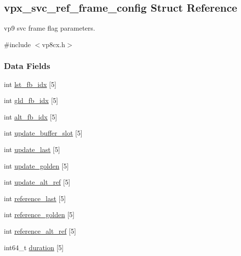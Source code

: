 \hypertarget{structvpx__svc__ref__frame__config}{}\subsection{vpx\+\_\+svc\+\_\+ref\+\_\+frame\+\_\+config Struct Reference}
\label{structvpx__svc__ref__frame__config}


vp9 svc frame flag parameters.  




{\ttfamily \#include $<$vp8cx.\+h$>$}

\subsubsection*{Data Fields}
\begin{DoxyCompactItemize}
\item 
int \hyperlink{structvpx__svc__ref__frame__config_a19b5483bc516fc83469d5967dc966783}{lst\+\_\+fb\+\_\+idx} \mbox{[}5\mbox{]}
\item 
int \hyperlink{structvpx__svc__ref__frame__config_a4af48b570c3262ad1d6fc7d436a7d5cc}{gld\+\_\+fb\+\_\+idx} \mbox{[}5\mbox{]}
\item 
int \hyperlink{structvpx__svc__ref__frame__config_ab2a913dc166956efad8bdf6ad009b2eb}{alt\+\_\+fb\+\_\+idx} \mbox{[}5\mbox{]}
\item 
int \hyperlink{structvpx__svc__ref__frame__config_a3ff7ebe7b8056278efbbb9abae4d830a}{update\+\_\+buffer\+\_\+slot} \mbox{[}5\mbox{]}
\item 
int \hyperlink{structvpx__svc__ref__frame__config_a8c6315e853ebf15e3e621332d77f4232}{update\+\_\+last} \mbox{[}5\mbox{]}
\item 
int \hyperlink{structvpx__svc__ref__frame__config_ae97b52fa83d6589a1efdae7f2747fe72}{update\+\_\+golden} \mbox{[}5\mbox{]}
\item 
int \hyperlink{structvpx__svc__ref__frame__config_a2f4ed0250ec58bc3b1faa0d49fbdf436}{update\+\_\+alt\+\_\+ref} \mbox{[}5\mbox{]}
\item 
int \hyperlink{structvpx__svc__ref__frame__config_a812c764e0bd981b7083d66557595aa09}{reference\+\_\+last} \mbox{[}5\mbox{]}
\item 
int \hyperlink{structvpx__svc__ref__frame__config_a8b61c119c626ec78b29ef52d0def7810}{reference\+\_\+golden} \mbox{[}5\mbox{]}
\item 
int \hyperlink{structvpx__svc__ref__frame__config_aab75feb72ec5cef3c6620765ac52c997}{reference\+\_\+alt\+\_\+ref} \mbox{[}5\mbox{]}
\item 
int64\+\_\+t \hyperlink{structvpx__svc__ref__frame__config_ab089b385aaa31730b1c1f7ad08f0e1f6}{duration} \mbox{[}5\mbox{]}
\end{DoxyCompactItemize}


